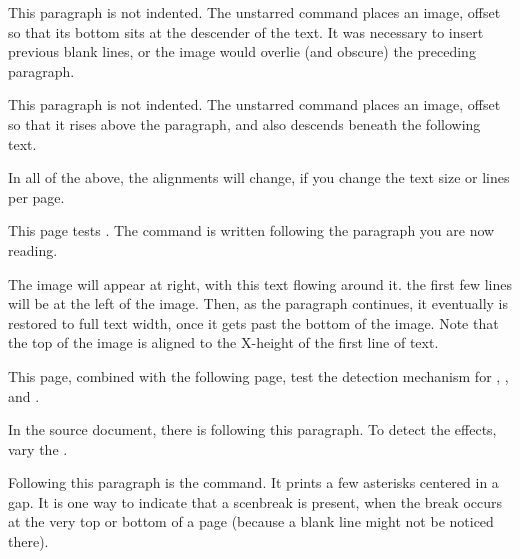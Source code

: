 \documentclass[test,shademargins,draft]{novel} %
\begin{document}
\null\null\null

\noindent{}This paragraph is not indented. The unstarred command places an image, offset so that its bottom sits at the descender of the text. It was necessary to insert previous blank lines, or the image would overlie (and obscure) the preceding paragraph.

\null\null

\noindent{}This paragraph is not indented. The unstarred command places an image, offset so that it rises above the paragraph, and also descends beneath the following text. 

\null\null

In all of the above, the alignments will change, if you change the text size or lines per page.

\clearpage



This page tests \string\WrapImage. The command is written following the paragraph you are now reading.


The image will appear at right, with this text flowing around it. the first few lines will be at the left of the image. Then, as the paragraph continues, it eventually is restored to full text width, once it gets past the bottom of the image. Note that the top of the image is aligned to the X-height of the first line of text.

\null
\null

\clearpage


This page, combined with the following page, test the detection mechanism for \string\scenebreak, \string\sceneline, and \string\scenestars.

In the source document, there is \string\vspace\space following this paragraph. To detect the effects, vary the \string\vspace.

\vspace{20\nbs} %

Following this paragraph is the \string\scenestars\space command. It prints a few asterisks centered in a gap. It is one way to indicate that a scenbreak is present, when the break occurs at the very top or bottom of a page (because a blank line might not be noticed there).

\scenestars
\end{document}
